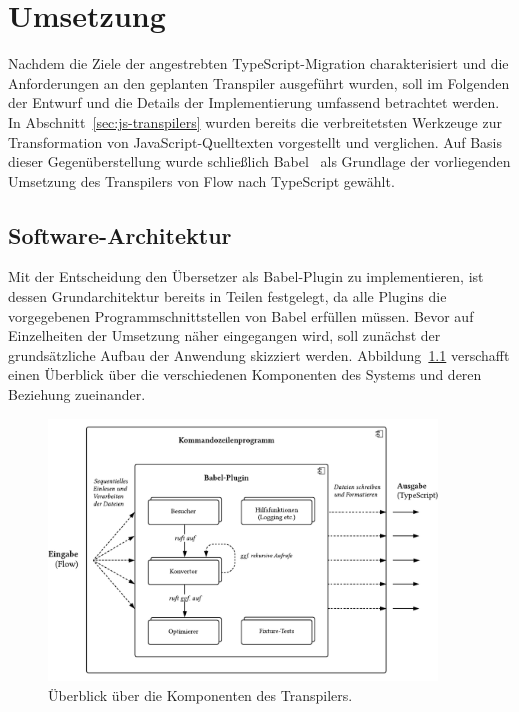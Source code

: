 \chapter{Umsetzung}
\label{chap:implementation}

Nachdem die Ziele der angestrebten TypeScript-Migration charakterisiert und die Anforderungen an den geplanten Transpiler ausgeführt wurden, soll im Folgenden der Entwurf und die Details der Implementierung umfassend betrachtet werden. In Abschnitt~\ref{sec:js-transpilers} wurden bereits die verbreitetsten Werkzeuge zur Transformation von JavaScript-Quelltexten vorgestellt und verglichen. Auf Basis dieser Gegenüberstellung wurde schließlich Babel~\autocite{BABEL} als Grundlage der vorliegenden Umsetzung des Transpilers von Flow nach TypeScript gewählt.

\section{Software-Architektur}
\label{sec:software-architecture}

Mit der Entscheidung den Übersetzer als Babel-Plugin zu implementieren, ist dessen Grundarchitektur bereits in Teilen festgelegt, da alle Plugins die vorgegebenen Programmschnittstellen von Babel erfüllen müssen. Bevor auf Einzelheiten der Umsetzung näher eingegangen wird, soll zunächst der grundsätzliche Aufbau der Anwendung skizziert werden. Abbildung~\ref{fig:architecture-overview} verschafft einen Überblick über die verschiedenen Komponenten des Systems und deren Beziehung zueinander.

\begin{figure}[tbp]
  \centering
  \includegraphics[width=0.92\textwidth]{src/4_Umsetzung/fig/architecture-overview.pdf}
  \caption{Überblick über die Komponenten des Transpilers.}
  \label{fig:architecture-overview}
\end{figure}

